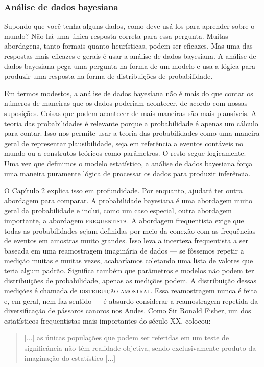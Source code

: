 \subsubsection{Análise de dados bayesiana}

Supondo que você tenha alguns dados, como deve usá-los para aprender sobre o mundo? Não há uma única resposta correta para essa pergunta. Muitas abordagens, tanto formais quanto heurísticas, podem ser eficazes. Mas uma das respostas mais eficazes e gerais é usar a análise de dados bayesiana. A análise de dados bayesiana pega uma pergunta na forma de um modelo e usa a lógica para produzir uma resposta na forma de distribuições de probabilidade.

Em termos modestos, a análise de dados bayesiana não é mais do que contar os números de maneiras que os dados poderiam acontecer, de acordo com nossas suposições. Coisas que podem acontecer de mais maneiras são mais plausíveis. A teoria das probabilidades é relevante porque a probabilidade é apenas um cálculo para contar. Isso nos permite usar a teoria das probabilidades como uma maneira geral de representar plausibilidade, seja em referência a eventos contáveis no mundo ou a construtos teóricos como parâmetros. O resto segue logicamente. Uma vez que definimos o modelo estatístico, a análise de dados bayesiana força uma maneira puramente lógica de processar os dados para produzir inferência.

O Capítulo 2 explica isso em profundidade. Por enquanto, ajudará ter outra abordagem para comparar. A probabilidade bayesiana é uma abordagem muito geral da probabilidade e inclui, como um caso especial, outra abordagem importante, a abordagem \textsc{frequentista}. A abordagem frequentista exige que todas as probabilidades sejam definidas por meio da conexão com as frequências de eventos em amostras muito grandes. Isso leva a incerteza frequentista a ser baseada em uma reamostragem imaginária de dados — se fôssemos repetir a medição muitas e muitas vezes, acabaríamos coletando uma lista de valores que teria algum padrão. Significa também que parâmetros e modelos não podem ter distribuições de probabilidade, apenas as medições podem. A distribuição dessas medições é chamada de \textsc{distribuição amostral}. Essa reamostragem nunca é feita e, em geral, nem faz sentido — é absurdo considerar a reamostragem repetida da diversificação de pássaros canoros nos Andes. Como Sir Ronald Fisher, um dos estatísticos frequentistas mais importantes do século XX, colocou:

\begin{quote}
  [...] as únicas populações que podem ser referidas em um teste de significância não têm realidade objetiva, sendo exclusivamente produto da imaginação do estatístico [...]
\end{quote}

